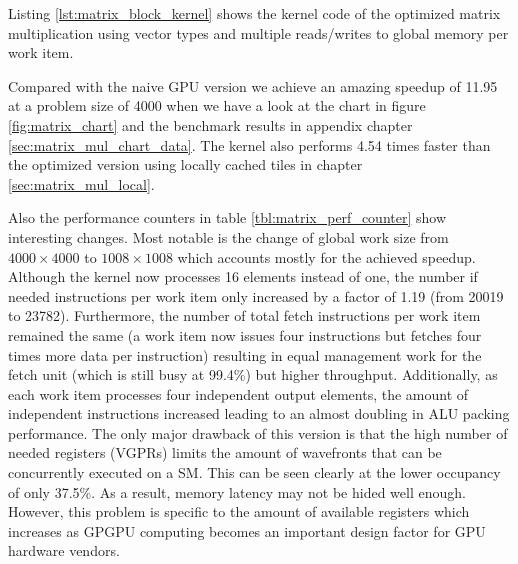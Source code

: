 Listing \ref{lst:matrix_block_kernel} shows the kernel code of the optimized matrix multiplication using vector types and multiple reads/writes to global memory per work item.



\pagebreak

Compared with the naive GPU version we achieve an amazing speedup of 11.95 at a problem size of 4000 when we have a look at the chart in figure \ref{fig:matrix_chart} and the benchmark results in appendix chapter \ref{sec:matrix_mul_chart_data}. The kernel also performs 4.54 times faster than the optimized version using locally cached tiles in chapter \ref{sec:matrix_mul_local}.

Also the performance counters in table \ref{tbl:matrix_perf_counter} show interesting changes. Most notable is the change of global work size from $4000 \times 4000$ to $1008 \times 1008$ which accounts mostly for the achieved speedup. Although the kernel now processes 16 elements instead of one, the number if needed instructions per work item only increased by a factor of 1.19 (from 20019 to 23782). Furthermore, the number of total fetch instructions per work item remained the same (a work item now issues four instructions but fetches four times more data per instruction) resulting in equal management work for the fetch unit (which is still busy at 99.4\%) but higher throughput. Additionally, as each work item processes four independent output elements, the amount of independent instructions increased leading to an almost doubling in ALU packing performance. The only major drawback of this version is that the high number of needed registers (VGPRs) limits the amount of wavefronts that can be concurrently executed on a SM. This can be seen clearly at the lower occupancy of only 37.5\%. As a result, memory latency may not be hided well enough. However, this problem is specific to the amount of available registers which increases as GPGPU computing becomes an important design factor for GPU hardware vendors.


